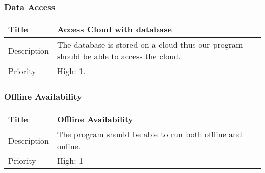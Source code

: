 \subsubsection{Data Access}
  \begin{table}[h!]
    \label{system-constraints/network-constraints/data-access-table}
    \begin{tabularx}{\textwidth}{|l|X|}
      \hline
      Title       & Access Cloud with database \\ \hline
      Description & The database is stored on a cloud thus our program
                    should be able to access the cloud. \\ \hline
      Priority    &   High: 1. \\ \hline
    \end{tabularx}
  \end{table}

\subsubsection{Offline Availability}
  \begin{table}[h!]
    \label{system-constraints/network-constraints/offline-table}
    \begin{tabularx}{\textwidth}{|l|X|}
      \hline
      Title       & Offline Availability \\ \hline
      Description & The program should be able to run both offline and online.
                    \\ \hline
      Priority    & High: 1 \\ \hline
    \end{tabularx}
  \end{table}
